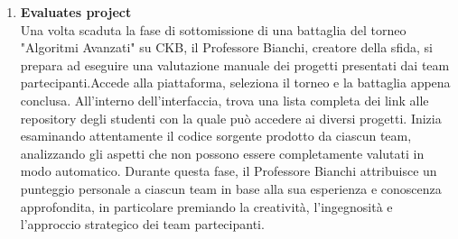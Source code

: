 \begin{enumerate}[label=\textbf{\Alph*}.]
\item \textbf{Evaluates project} \\
Una volta scaduta la fase di sottomissione di una battaglia del torneo "Algoritmi Avanzati" su CKB, il Professore Bianchi, creatore della sfida, si prepara ad eseguire una valutazione manuale dei progetti presentati dai team partecipanti.Accede alla piattaforma, seleziona il torneo e la battaglia appena conclusa. All'interno dell'interfaccia, trova una lista completa dei link alle repository degli studenti con la quale può accedere ai diversi progetti.
Inizia esaminando attentamente il codice sorgente prodotto da ciascun team, analizzando gli aspetti che non possono essere completamente valutati in modo automatico.
Durante questa fase, il Professore Bianchi attribuisce un punteggio personale a ciascun team in base alla sua esperienza e conoscenza approfondita, in particolare premiando la creatività, l'ingegnosità e l'approccio strategico dei team partecipanti.



\end{enumerate}
